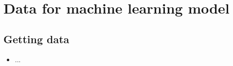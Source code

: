\chapter{Data for machine learning model}\label{sec:preprocessing}

\section{Getting data}
    \begin{itemize}
        \item ...
    \end{itemize}
